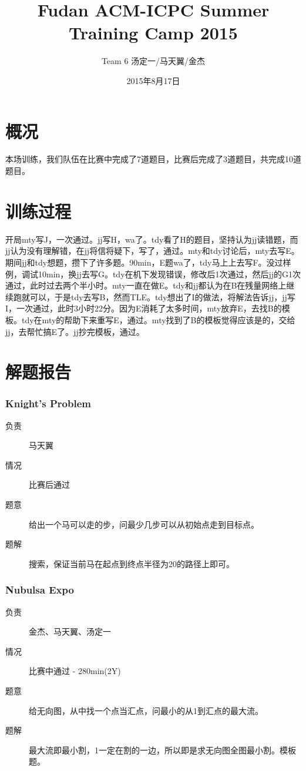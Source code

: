 \documentclass[a4paper, 11pt, nofonts, nocap, fancyhdr]{ctexart}
\title{Fudan ACM-ICPC Summer Training Camp 2015}
\author{Team 6 汤定一/马天翼/金杰}
\date{2015年8月17日}
\newcommand{\problem}[1]{\subsubsection{#1}}
\begin{document}
\maketitle

\section{概况}

本场训练，我们队伍在比赛中完成了7道题目，比赛后完成了3道题目，共完成10道题目。

\section{训练过程}

开局mty写J，一次通过。jj写H，wa了。tdy看了H的题目，坚持认为jj读错题，而jj认为没有理解错，在jj将信将疑下，写了，通过。mty和tdy讨论后，mty去写E。期间jj和tdy想题，攒下了许多题。90min，E题wa了，tdy马上上去写F。没过样例，调试10min，换jj去写G。tdy在机下发现错误，修改后1次通过，然后jj的G1次通过，此时过去两个半小时。mty一直在做E。tdy和jj都认为在B在残量网络上继续跑就可以，于是tdy去写B，然而TLE。tdy想出了I的做法，将解法告诉jj，jj写I，一次通过，此时3小时22分。因为E消耗了太多时间，mty放弃E，去找B的模板。tdy在mty的帮助下来重写E，通过。mty找到了B的模板觉得应该是的，交给jj，去帮忙搞E了。jj抄完模板，通过。

\section{解题报告}

\problem{Knight's Problem}

\begin{description}
\item[负责] 马天翼
\item[情况] 比赛后通过
\item[题意]
给出一个马可以走的步，问最少几步可以从初始点走到目标点。
\item[题解]
搜索，保证当前马在起点到终点半径为20的路径上即可。
\end{description}

\problem{Nubulsa Expo}

\begin{description}
\item[负责] 金杰、马天翼、汤定一
\item[情况] 比赛中通过 - 280min(2Y)
\item[题意]
给无向图，从中找一个点当汇点，问最小的从1到汇点的最大流。
\item[题解]
最大流即最小割，1一定在割的一边，所以即是求无向图全图最小割。模板题。
\end{description}
\end{document}
